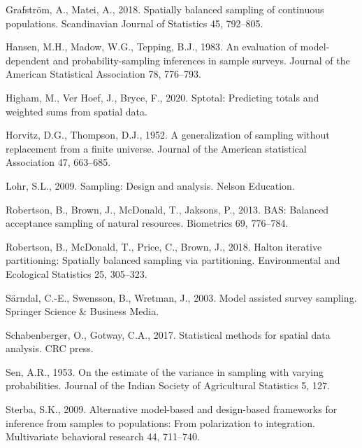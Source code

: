 \documentclass[]{elsarticle} %
\begin{document}
\leavevmode\hypertarget{ref-grafstrom2018spatially}{}%
Grafström, A., Matei, A., 2018. Spatially balanced sampling of
continuous populations. Scandinavian Journal of Statistics 45, 792--805.

\leavevmode\hypertarget{ref-hansen1983evaluation}{}%
Hansen, M.H., Madow, W.G., Tepping, B.J., 1983. An evaluation of
model-dependent and probability-sampling inferences in sample surveys.
Journal of the American Statistical Association 78, 776--793.

\leavevmode\hypertarget{ref-higham2020sptotal}{}%
Higham, M., Ver Hoef, J., Bryce, F., 2020. Sptotal: Predicting totals
and weighted sums from spatial data.

\leavevmode\hypertarget{ref-horvitz1952generalization}{}%
Horvitz, D.G., Thompson, D.J., 1952. A generalization of sampling
without replacement from a finite universe. Journal of the American
statistical Association 47, 663--685.

\leavevmode\hypertarget{ref-lohr2009sampling}{}%
Lohr, S.L., 2009. Sampling: Design and analysis. Nelson Education.

\leavevmode\hypertarget{ref-robertson2013bas}{}%
Robertson, B., Brown, J., McDonald, T., Jaksons, P., 2013. BAS: Balanced
acceptance sampling of natural resources. Biometrics 69, 776--784.

\leavevmode\hypertarget{ref-robertson2018halton}{}%
Robertson, B., McDonald, T., Price, C., Brown, J., 2018. Halton
iterative partitioning: Spatially balanced sampling via partitioning.
Environmental and Ecological Statistics 25, 305--323.

\leavevmode\hypertarget{ref-sarndal2003model}{}%
Särndal, C.-E., Swensson, B., Wretman, J., 2003. Model assisted survey
sampling. Springer Science \& Business Media.

\leavevmode\hypertarget{ref-schabenberger2017statistical}{}%
Schabenberger, O., Gotway, C.A., 2017. Statistical methods for spatial
data analysis. CRC press.

\leavevmode\hypertarget{ref-sen1953estimate}{}%
Sen, A.R., 1953. On the estimate of the variance in sampling with
varying probabilities. Journal of the Indian Society of Agricultural
Statistics 5, 127.

\leavevmode\hypertarget{ref-sterba2009alternative}{}%
Sterba, S.K., 2009. Alternative model-based and design-based frameworks
for inference from samples to populations: From polarization to
integration. Multivariate behavioral research 44, 711--740.
\end{document}
